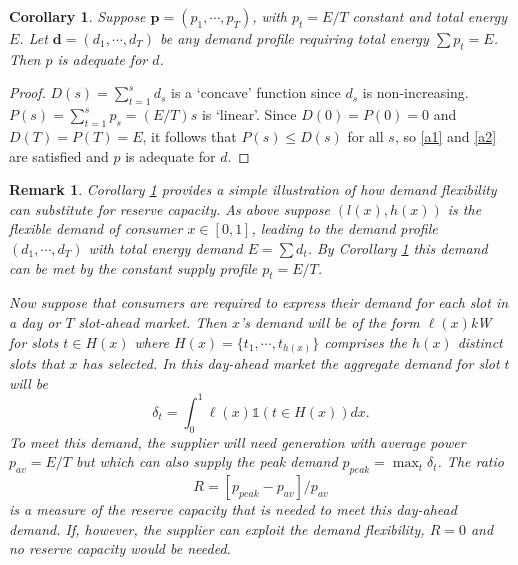 \documentclass[10pt,draftcls,onecolumn]{IEEEtran}
\newtheorem{corollary}{Corollary}
\newtheorem{remark}{Remark}
\let \VEC \mathbf
\def\ind{{\mathds{1}}}
\newcounter{l1}
\newcounter{l2}
\newcounter{l3}
\begin{document}
\begin{corollary}\label{cor:reserve}
Suppose $\VEC p = (p_1, \cdots , p_T)$, with $p_t = E/T$ constant and total energy $E$.  Let $\VEC d = (d_1, \cdots, d_T)$ be any demand profile requiring total energy $\sum p_t = E$.  Then $p$ is adequate for $d$.
\end{corollary}
\begin{proof}
$D(s) = \sum _{t=1}^s d_s$ is a `concave' function since $d_s$ is non-increasing.  $P(s) = \sum_{t=1}^s p_s = (E/T)s$ is `linear'.  Since $D(0) = P(0) = 0$
and $D(T) = P(T) =E$, it follows that  $P(s) \le D(s)$ for all $s$, so \eqref{a1} and \eqref{a2} are satisfied and $p$ is adequate for $d$. 
\end{proof}
\begin{remark}
Corollary \ref{cor:reserve}  provides a simple illustration of how demand flexibility can substitute for reserve capacity.  As above suppose $(l(x), h(x))$ is the 
flexible demand of consumer $x \in [0,1]$, leading to the demand profile $(d_1, \cdots, d_T)$ with total energy demand $E = \sum d_t$.  By Corollary \ref{cor:reserve} this demand can be met
by the constant supply profile $p_t= E/T$.

Now suppose that consumers are required to express their demand for each slot in a day or $T$ slot-ahead market.  Then  $x$'s demand will be of the form
$\ell (x) $kW for slots $t \in H(x)$ where  $H(x) = \{t_1, \cdots , t_{h(x)}\}$ comprises the $h(x)$ distinct slots that $x$ has selected.  In this day-ahead market the aggregate demand for slot $t$ will be 
\[\delta_t = \int_0^1 \ell (x) \ind (t \in H(x)) dx .\]
To meet this demand, the supplier will need generation with average power $p_{av} =E/T$ but which  can also supply the peak demand $p_{peak} = \max_t \delta_t$.   The  ratio 
\[R = [p_{peak} - p_{av}]/p_{av}\]
 is a measure of the reserve capacity that is needed to meet this day-ahead demand.  If, however, the
supplier can exploit the demand flexibility, $R=0$ and \textit{ no }reserve capacity would be needed.
\end{remark}
\end{document}
